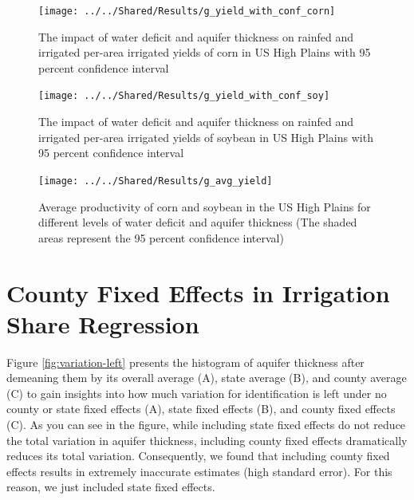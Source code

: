 \documentclass[
]{article}
\begin{document}
\begin{figure}[H]

{\centering \texttt{[image: ../../Shared/Results/g\_yield\_with\_conf\_corn]} 

}

\caption{The impact of water deficit and aquifer thickness on rainfed and irrigated per-area irrigated yields of corn in US High Plains with 95 percent confidence interval}\label{fig:irrigated-yield-ind-corn}
\end{figure}

\begin{figure}[H]

{\centering \texttt{[image: ../../Shared/Results/g\_yield\_with\_conf\_soy]} 

}

\caption{The impact of water deficit and aquifer thickness on rainfed and irrigated per-area irrigated yields of soybean in US High Plains with 95 percent confidence interval}\label{fig:irrigated-yield-ind-soy}
\end{figure}

\begin{figure}[H]

{\centering \texttt{[image: ../../Shared/Results/g\_avg\_yield]} 

}

\caption{Average productivity of corn and soybean in the US High Plains for different levels of water deficit and aquifer thickness (The shaded areas represent the 95 percent confidence interval)}\label{fig:avg-yield-ind}
\end{figure}

\clearpage

\hypertarget{county-fe}{%
\section{County Fixed Effects in Irrigation Share Regression}\label{county-fe}}

\setcounter{figure}{0}
\renewcommand{\thefigure}{B.\arabic{figure}}

Figure \ref{fig:variation-left} presents the histogram of aquifer thickness after demeaning them by its overall average (A), state average (B), and county average (C) to gain insights into how much variation for identification is left under no county or state fixed effects (A), state fixed effects (B), and county fixed effects (C). As you can see in the figure, while including state fixed effects do not reduce the total variation in aquifer thickness, including county fixed effects dramatically reduces its total variation. Consequently, we found that including county fixed effects results in extremely inaccurate estimates (high standard error). For this reason, we just included state fixed effects.
\end{document}
